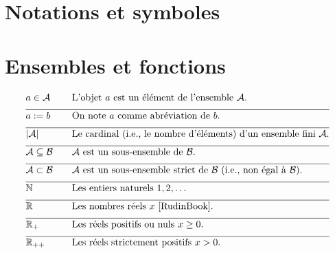 
\section*{Notations et symboles}

\vspace*{-2mm}
\section*{Ensembles et fonctions} 

\begin{align} 
	&a \in \mathcal{A} & \quad & \parbox{.75\textwidth}{L'objet $a$ est un élément de l'ensemble $\mathcal{A}$.} \nonumber \\[2mm] \hline \nonumber\\[-5mm]
	&a \defeq b & \quad & \mbox{On note $a$ comme abréviation de $b$. }\nonumber \\[2mm] \hline \nonumber\\[-5mm]
	&|\mathcal{A}| & \quad & \mbox{Le cardinal (i.e., le nombre d'éléments) d'un ensemble fini $\mathcal{A}$.}\nonumber \\[2mm] \hline \nonumber\\[-5mm]
	&\mathcal{A} \subseteq \mathcal{B}& \quad & \mbox{$\mathcal{A}$ est un sous-ensemble de $\mathcal{B}$.}\nonumber \\[2mm] \hline \nonumber\\[-5mm]
	&\mathcal{A} \subset \mathcal{B}& \quad & \mbox{$\mathcal{A}$ est un sous-ensemble strict de $\mathcal{B}$ (i.e., non égal à $\mathcal{B}$).} \nonumber \\[2mm] \hline \nonumber\\[-5mm]
	&\mathbb{N} & \quad & \mbox{Les entiers naturels $1,2,\ldots$}\nonumber \\[2mm] \hline \nonumber\\[-5mm]
	&\mathbb{R}  &\quad &\mbox{Les nombres réels $x$ \cite{RudinBook}.} \nonumber \\[2mm] \hline \nonumber\\[-5mm]
	&\mathbb{R}_{+}  &\quad &\mbox{Les réels positifs ou nuls $x\geq0$.}\nonumber \\[2mm] \hline \nonumber\\[-5mm]
	&\mathbb{R}_{++}  &\quad &\mbox{Les réels strictement positifs $x> 0$.} \nonumber
\end{align} 

